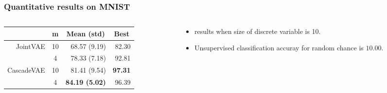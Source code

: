 \documentclass[10pt,mathserif]{beamer}
\begin{document}
\begin{frame}
\begin{itemize}
\begin{figure}
%
\end{figure}
\end{itemize}
\end{frame}


\begin{frame}
\frametitle{Quantitative results on MNIST}
\begin{columns}
\begin{column}{0.5\textwidth}
\begin{table}[htbp]
\centering
\fontsize{9pt}{9.5pt}\selectfont
\begin{tabular}{rc rr}
\addlinespace[-\aboverulesep]
\toprule
\multicolumn{1}{c}{Method}&m& \multicolumn{1}{c}{Mean (std)}&\multicolumn{1}{c}{Best}\\
\toprule
JointVAE & 10&68.57 (9.19) &82.30\\
        &  4&78.33 (7.18) &92.81\\
\midrule
CascadeVAE &10&81.41 (9.54)& \textbf{97.31}\\
           & 4&\textbf{84.19 (5.02)}& 96.39\\
\bottomrule
\end{tabular}
\end{table}
\end{column}
\begin{column}{0.4\textwidth}
\begin{itemize}\itemsep=12pt
\item {\color{blue}{Unsupervised classification}} results  when size of discrete variable is 10.
\item Unsupervised classification accuray for random chance is $10.00$.
\end{itemize}

\end{column}
\end{columns}
\end{frame}
\end{document}

